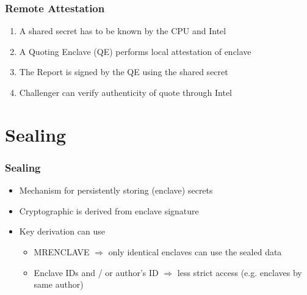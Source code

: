 
\begin{frame}
    \frametitle{Remote Attestation}
    \begin{enumerate}[<+->]
        \item A shared secret has to be known by the CPU and Intel
        \item A Quoting Enclave (QE) performs local attestation of enclave
        \item The Report is signed by the QE using the shared secret
        \item Challenger can verify authenticity of quote through Intel
    \end{enumerate}
\end{frame}


\section{Sealing}

\begin{frame}
    \frametitle{Sealing}
    \begin{itemize}[<+->]
        \item Mechanism for persistently storing (enclave) secrets
        \item Cryptographic is derived from enclave signature
        \item Key derivation can use
        \begin{itemize}
            \item MRENCLAVE $\Rightarrow$ only identical enclaves can use the sealed data
            \item Enclave IDs and / or author's ID $\Rightarrow$ less strict access (e.g. enclaves by same author)
        \end{itemize}
    \end{itemize}
\end{frame}